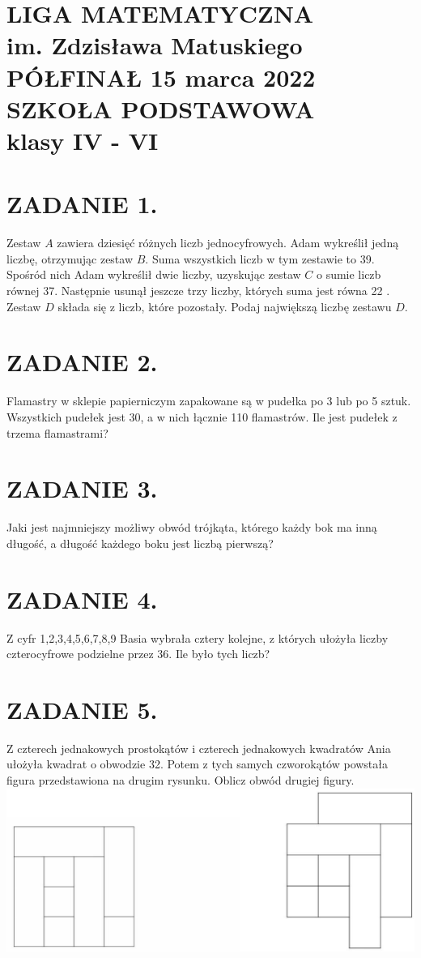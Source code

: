 \documentclass[10pt]{article}
\begin{document}
\section*{LIGA MATEMATYCZNA \\
 im. Zdzisława Matuskiego \\
 PÓŁFINAŁ 15 marca 2022 \\
 SZKOŁA PODSTAWOWA \\
 klasy IV - VI}
\section*{ZADANIE 1.}
Zestaw \(A\) zawiera dziesięć różnych liczb jednocyfrowych. Adam wykreślił jedną liczbę, otrzymując zestaw \(B\). Suma wszystkich liczb w tym zestawie to 39. Spośród nich Adam wykreślił dwie liczby, uzyskując zestaw \(C\) o sumie liczb równej 37. Następnie usunął jeszcze trzy liczby, których suma jest równa 22 . Zestaw \(D\) składa się z liczb, które pozostały. Podaj największą liczbę zestawu \(D\).

\section*{ZADANIE 2.}
Flamastry w sklepie papierniczym zapakowane są w pudełka po 3 lub po 5 sztuk. Wszystkich pudełek jest 30, a w nich łącznie 110 flamastrów. Ile jest pudełek z trzema flamastrami?

\section*{ZADANIE 3.}
Jaki jest najmniejszy możliwy obwód trójkąta, którego każdy bok ma inną długość, a długość każdego boku jest liczbą pierwszą?

\section*{ZADANIE 4.}
Z cyfr 1,2,3,4,5,6,7,8,9 Basia wybrała cztery kolejne, z których ułożyła liczby czterocyfrowe podzielne przez 36. Ile było tych liczb?

\section*{ZADANIE 5.}
Z czterech jednakowych prostokątów i czterech jednakowych kwadratów Ania ułożyła kwadrat o obwodzie 32. Potem z tych samych czworokątów powstała figura przedstawiona na drugim rysunku. Oblicz obwód drugiej figury.\\
\includegraphics[max width=\textwidth, center]{2024_11_21_6db36f485c30a3a4f8d0g-1(2)}
\end{document}
